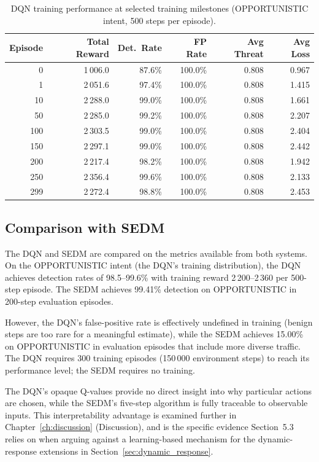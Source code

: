 \begin{table}[ht]
  \centering
  \caption{DQN training performance at selected training milestones
           (OPPORTUNISTIC intent, 500 steps per episode).}
  \label{tab:dqn_milestones}
  \begin{tabular}{rrrrrr}
    \toprule
    Episode & Total Reward & Det.\ Rate & FP Rate & Avg Threat & Avg Loss \\
    \midrule
    0   & 1\,006.0 & 87.6\% & 100.0\% & 0.808 & 0.967 \\
    1   & 2\,051.6 & 97.4\% & 100.0\% & 0.808 & 1.415 \\
    10  & 2\,288.0 & 99.0\% & 100.0\% & 0.808 & 1.661 \\
    50  & 2\,285.0 & 99.2\% & 100.0\% & 0.808 & 2.207 \\
    100 & 2\,303.5 & 99.0\% & 100.0\% & 0.808 & 2.404 \\
    150 & 2\,297.1 & 99.0\% & 100.0\% & 0.808 & 2.442 \\
    200 & 2\,217.4 & 98.2\% & 100.0\% & 0.808 & 1.942 \\
    250 & 2\,356.4 & 99.6\% & 100.0\% & 0.808 & 2.133 \\
    299 & 2\,272.4 & 98.8\% & 100.0\% & 0.808 & 2.453 \\
    \bottomrule
  \end{tabular}
\end{table}

\subsection{Comparison with SEDM}

The DQN and SEDM are compared on the metrics available from both systems.
On the OPPORTUNISTIC intent (the DQN's training distribution), the DQN
achieves detection rates of 98.5--99.6\% with training reward
2\,200--2\,360 per 500-step episode.
The SEDM achieves 99.41\% detection on OPPORTUNISTIC in 200-step evaluation
episodes.

However, the DQN's false-positive rate is effectively undefined in training
(benign steps are too rare for a meaningful estimate), while the SEDM
achieves 15.00\% on OPPORTUNISTIC in evaluation episodes that include more
diverse traffic.
The DQN requires 300 training episodes (150\,000 environment steps) to
reach its performance level; the SEDM requires no training.

The DQN's opaque Q-values provide no direct insight into why particular
actions are chosen, while the SEDM's five-step algorithm is fully
traceable to observable inputs.
This interpretability advantage is examined further in Chapter~\ref{ch:discussion}
(Discussion), and is the specific evidence Section~5.3 relies on when
arguing against a learning-based mechanism for the dynamic-response
extensions in Section~\ref{sec:dynamic_response}.

